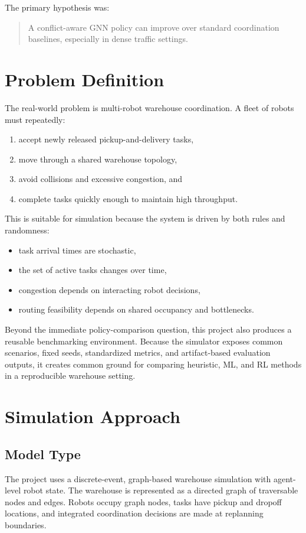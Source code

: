 \documentclass[11pt]{article}
\begin{document}
The primary hypothesis was:
\begin{quote}
A conflict-aware GNN policy can improve over standard coordination baselines, especially in dense traffic settings.
\end{quote}

\section{Problem Definition}
The real-world problem is multi-robot warehouse coordination. A fleet of robots must repeatedly:
\begin{enumerate}[leftmargin=1.5em]
    \item accept newly released pickup-and-delivery tasks,
    \item move through a shared warehouse topology,
    \item avoid collisions and excessive congestion, and
    \item complete tasks quickly enough to maintain high throughput.
\end{enumerate}

This is suitable for simulation because the system is driven by both rules and randomness:
\begin{itemize}[leftmargin=1.5em]
    \item task arrival times are stochastic,
    \item the set of active tasks changes over time,
    \item congestion depends on interacting robot decisions,
    \item routing feasibility depends on shared occupancy and bottlenecks.
\end{itemize}

Beyond the immediate policy-comparison question, this project also produces a reusable benchmarking environment. Because the simulator exposes common scenarios, fixed seeds, standardized metrics, and artifact-based evaluation outputs, it creates common ground for comparing heuristic, ML, and RL methods in a reproducible warehouse setting.

\section{Simulation Approach}
\subsection{Model Type}
The project uses a discrete-event, graph-based warehouse simulation with agent-level robot state. The warehouse is represented as a directed graph of traversable nodes and edges. Robots occupy graph nodes, tasks have pickup and dropoff locations, and integrated coordination decisions are made at replanning boundaries.
\end{document}
